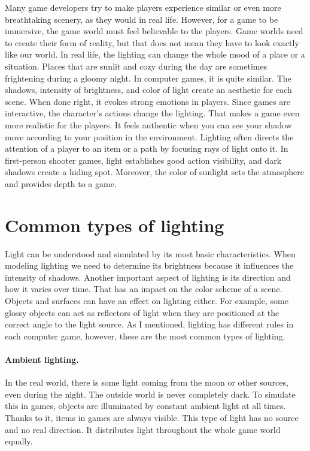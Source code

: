 \documentclass[10pt,twoside,english,a4paper]{article}
\begin{document}
Many game developers try to make players experience similar or even more breathtaking scenery, as they would in real life. However, for a game to be immersive, the game world must feel believable to the players. Game worlds need to create their form of reality, but that does not mean they have to look exactly like our world. \cite{Oudshoorn:Ray-Tracing} In real life, the lighting can change the whole mood of a place or a situation. Places that are sunlit and cozy during the day are sometimes frightening during a gloomy night. In computer games, it is quite similar. The shadows, intensity of brightness, and color of light create an aesthetic for each scene. When done right, it evokes strong emotions in players. Since games are interactive, the character's actions change the lighting. That makes a game even more realistic for the players. It feels authentic when you can see your shadow move according to your position in the environment. \cite{Pluralsight} Lighting often directs the attention of a player to an item or a path by focusing rays of light onto it. In first-person shooter games, light establishes good action visibility, and dark shadows create a hiding spot. Moreover, the color of sunlight sets the atmosphere and provides depth to a game. \cite{El-Nasr}


\section{Common types of lighting} \label{third}
Light can be understood and simulated by its most basic characteristics. When modeling lighting we need to determine its brightness because it influences the intensity of shadows. Another important aspect of lighting is its direction and how it varies over time. That has an impact on the color scheme of a scene. Objects and surfaces can have an effect on lighting either. For example, some glossy objects can act as reflectors of light when they are positioned at the correct angle to the light source. As I mentioned, lighting has different rules in each computer game, however, these are the most common types of lighting. \cite{Dynamic-Lighting}

\paragraph{Ambient lighting.}
In the real world, there is some light coming from the moon or other sources, even during the night. The outside world is never completely dark. To simulate this in games, objects are illuminated by constant ambient light at all times. Thanks to it, items in games are always visible. This type of light has no source and no real direction. It distributes light throughout the whole game world equally. \cite{Prall}
\end{document}
